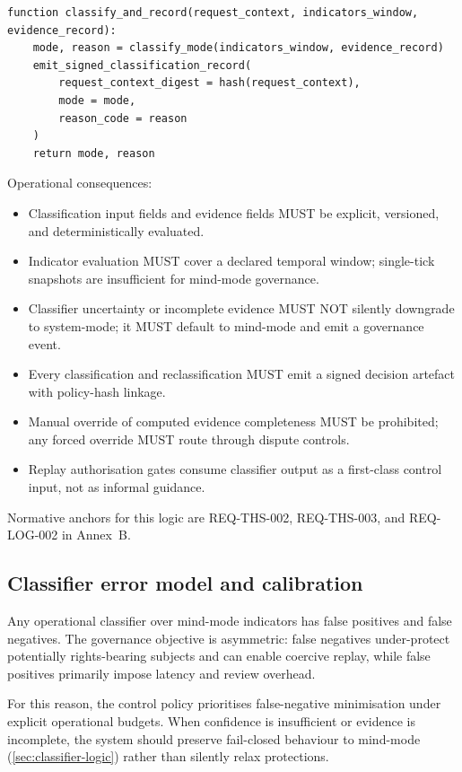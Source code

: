 \documentclass[11pt]{article}
\theoremstyle{definition}
\theoremstyle{plain}
\theoremstyle{remark}
\begin{document}
\begin{verbatim}
function classify_and_record(request_context, indicators_window, evidence_record):
    mode, reason = classify_mode(indicators_window, evidence_record)
    emit_signed_classification_record(
        request_context_digest = hash(request_context),
        mode = mode,
        reason_code = reason
    )
    return mode, reason
\end{verbatim}

Operational consequences:
\begin{itemize}[leftmargin=*]
  \item Classification input fields and evidence fields MUST be explicit, versioned, and deterministically evaluated.
  \item Indicator evaluation MUST cover a declared temporal window; single-tick snapshots are insufficient for mind-mode governance.
  \item Classifier uncertainty or incomplete evidence MUST NOT silently downgrade to system-mode; it MUST default to mind-mode and emit a governance event.
  \item Every classification and reclassification MUST emit a signed decision artefact with policy-hash linkage.
  \item Manual override of computed evidence completeness MUST be prohibited; any forced override MUST route through dispute controls.
  \item Replay authorisation gates consume classifier output as a first-class control input, not as informal guidance.
\end{itemize}

Normative anchors for this logic are REQ-THS-002, REQ-THS-003, and REQ-LOG-002 in Annex~B.

\subsection{Classifier error model and calibration}
\label{sec:classifier-errors}
Any operational classifier over mind-mode indicators has false positives and false negatives.
The governance objective is asymmetric:
false negatives under-protect potentially rights-bearing subjects and can enable coercive replay,
while false positives primarily impose latency and review overhead.

For this reason, the control policy prioritises false-negative minimisation under explicit operational
budgets.  When confidence is insufficient or evidence is incomplete, the system should preserve fail-closed
behaviour to mind-mode (\cref{sec:classifier-logic}) rather than silently relax protections.
\end{document}
